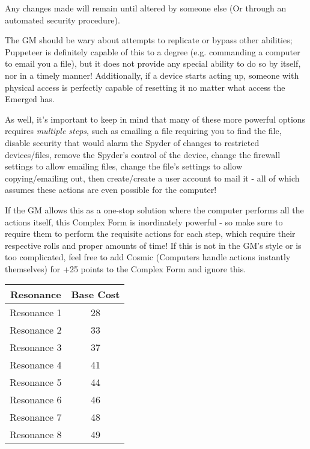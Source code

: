 \begin{multicols*}{3}
	Any changes made will remain until altered by someone else (Or through an automated security procedure).
	
	The GM should be wary about attempts to replicate or bypass other abilities; Puppeteer is definitely capable of this to a degree (e.g. commanding a computer to email you a file), but it does not provide any special ability to do so by itself, nor in a timely manner! Additionally, if a device starts acting up, someone with physical access is perfectly capable of resetting it no matter what access the Emerged has. 
	
	As well, it's important to keep in mind that many of these more powerful options requires \textit{multiple steps}, such as emailing a file requiring you to find the file, disable security that would alarm the Spyder of changes to restricted devices/files, remove the Spyder's control of the device,  change the firewall settings to allow emailing files, change the file's settings to allow copying/emailing out, then create/create a user account to mail it - all of which assumes these actions are even possible for the computer! 
	
	If the GM allows this as a one-stop solution where the computer performs all the actions itself, this Complex Form is inordinately powerful - so make sure to require them to perform the requisite actions for each step, which require their respective rolls and proper amounts of time! If this is not in the GM's style or is too complicated, feel free to add Cosmic (Computers handle actions instantly themselves) for +25 points to the Complex Form and ignore this.
	
	\begin{center}
		\begin{tabular}{|c|c|}
			\hline
			Resonance & Base Cost\\
			\hline
			\hline
			Resonance 1 & 28 \\
			Resonance 2 & 33 \\
			Resonance 3 & 37 \\
			Resonance 4 & 41 \\
			Resonance 5 & 44 \\
			Resonance 6 & 46 \\
			Resonance 7 & 48 \\
			Resonance 8 & 49 \\
			\hline
		\end{tabular}
	\end{center}
	

\end{multicols*}

